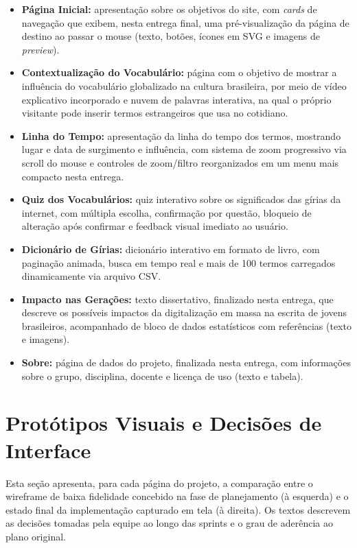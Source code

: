 \documentclass[12pt,a4paper]{article}
\begin{document}
\begin{itemize}[leftmargin=*]
    \item \textbf{Página Inicial:} apresentação sobre os objetivos do site, com \textit{cards}
    de navegação que exibem, nesta entrega final, uma pré-visualização da página de destino ao
    passar o mouse (texto, botões, ícones em SVG e imagens de \textit{preview}).
    \item \textbf{Contextualização do Vocabulário:} página com o objetivo de mostrar a
    influência do vocabulário globalizado na cultura brasileira, por meio de vídeo explicativo
    incorporado e nuvem de palavras interativa, na qual o próprio visitante pode inserir termos
    estrangeiros que usa no cotidiano.
    \item \textbf{Linha do Tempo:} apresentação da linha do tempo dos termos, mostrando lugar e
    data de surgimento e influência, com sistema de zoom progressivo via scroll do mouse e
    controles de zoom/filtro reorganizados em um menu mais compacto nesta entrega.
    \item \textbf{Quiz dos Vocabulários:} quiz interativo sobre os significados das gírias da
    internet, com múltipla escolha, confirmação por questão, bloqueio de alteração após
    confirmar e feedback visual imediato ao usuário.
    \item \textbf{Dicionário de Gírias:} dicionário interativo em formato de livro, com
    paginação animada, busca em tempo real e mais de 100 termos carregados dinamicamente via
    arquivo CSV.
    \item \textbf{Impacto nas Gerações:} texto dissertativo, finalizado nesta entrega, que
    descreve os possíveis impactos da digitalização em massa na escrita de jovens brasileiros,
    acompanhado de bloco de dados estatísticos com referências (texto e imagens).
    \item \textbf{Sobre:} página de dados do projeto, finalizada nesta entrega, com informações
    sobre o grupo, disciplina, docente e licença de uso (texto e tabela).
\end{itemize}

\section{Protótipos Visuais e Decisões de Interface}

Esta seção apresenta, para cada página do projeto, a comparação entre o wireframe de baixa
fidelidade concebido na fase de planejamento (à esquerda) e o estado final da implementação
capturado em tela (à direita). Os textos descrevem as decisões tomadas pela equipe ao longo das
sprints e o grau de aderência ao plano original.
\end{document}
